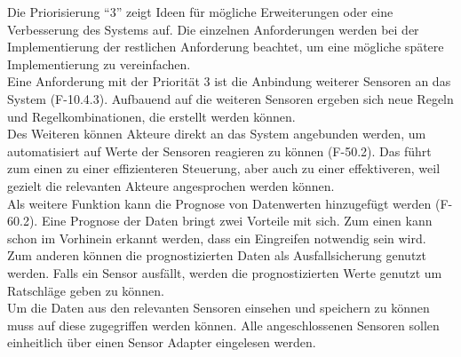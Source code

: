 Die Priorisierung ``3'' zeigt Ideen für mögliche Erweiterungen oder eine Verbesserung des Systems auf. Die einzelnen Anforderungen werden bei der Implementierung der restlichen Anforderung beachtet, um eine mögliche spätere Implementierung zu vereinfachen.\\
Eine Anforderung mit der Priorität 3 ist die Anbindung weiterer Sensoren an das System (F-10.4.3). Aufbauend auf die weiteren Sensoren ergeben sich neue Regeln und Regelkombinationen, die erstellt werden können.\\
Des Weiteren können Akteure direkt an das System angebunden werden, um automatisiert auf Werte der Sensoren reagieren zu können (F-50.2). Das führt zum einen zu einer effizienteren Steuerung, aber auch zu einer effektiveren, weil gezielt die relevanten Akteure angesprochen werden können.\\
Als weitere Funktion kann die Prognose von Datenwerten hinzugefügt werden (F-60.2). Eine Prognose der Daten bringt zwei Vorteile mit sich. Zum einen kann schon im Vorhinein erkannt werden, dass ein Eingreifen notwendig sein wird. Zum anderen können die prognostizierten Daten als Ausfallsicherung genutzt werden. Falls ein Sensor ausfällt, werden die prognostizierten Werte genutzt um Ratschläge geben zu können.\\
Um die Daten aus den relevanten Sensoren einsehen und speichern zu können muss auf diese zugegriffen werden können. Alle angeschlossenen Sensoren sollen einheitlich über einen Sensor Adapter eingelesen werden.

